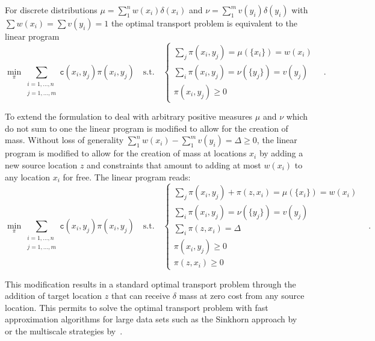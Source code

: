 \documentclass{llncs}
\newcommand{\cost}[0]{\mathtt{c}}
\newcommand{\coupling}[0]{\pi}
\begin{document}
For discrete distributions $\mu = \sum_1^n w(x_i) \delta(x_i)$ and $ \nu =
\sum_1^m v(y_i) \delta(y_i)$ with $\sum w(x_i) = \sum v(y_i) = 1$ the optimal
transport problem is equivalent to the linear program 
\begin{equation}
\min_\coupling \sum_{\substack{i=1,\dots,n\\ j=1,\dots,m}} 
      \cost(x_i, y_j) \coupling(x_i, y_j) \quad \text{s.t.}\quad 
\begin{cases}
\sum_j \coupling(x_i, y_j) = \mu(\{x_i\}) = w(x_i) & \\ 
\sum_i \coupling(x_i, y_j) = \nu(\{y_j\}) = v(y_j) & \\
 \coupling(x_i,y_j)\ge 0
\end{cases}\,.
\label{eq:balanced}
\end{equation} 

To extend the formulation to deal with arbitrary positive measures $\mu$ and
$\nu$ which do not sum to one the linear program is modified to allow for the
creation of mass. Without loss of generality $\sum_1^n w(x_i)  - \sum_1^m
v(y_i) = \Delta \ge 0$, the linear program is modified to allow for the
creation of mass at locations $x_i$ by adding a new source location $z$ and
constraints that amount to adding at most $w(x_i)$ to any location $x_i$ for
free. The linear program reads: 
\begin{equation}
\min_\coupling \sum_{\substack{i=1,\dots,n\\ j=1,\dots,m}} 
      \cost(x_i, y_j) \coupling(x_i, y_j) \quad \text{s.t.}\quad 
\begin{cases}
  \sum_j \coupling(x_i, y_j) + \coupling(z, x_i) = \mu(\{x_i\}) = w(x_i) & \\ 
  \sum_i \coupling(x_i, y_j) = \nu(\{y_j\}) = v(y_j) & \\
  \sum_i \coupling(z, x_i)  = \Delta \\
  \coupling(x_i, y_j) \ge 0 \\
  \coupling(z, x_i) \ge 0
\end{cases}\,.
\label{eq:unbalanced}
\end{equation} 

This modification results in a standard optimal transport problem through the
addition of target location $z$ that can receive $\delta$ mass at zero cost
from any source location.  This permits to solve the optimal transport problem
with fast approximation algorithms for large data sets such as the Sinkhorn
approach by~\cite{cutuiri:} or the multiscale strategies
by~\citet{gerber:jmlr17}. 
\end{document}
